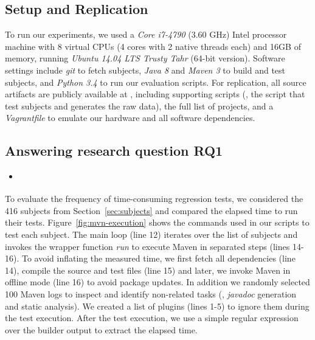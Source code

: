 \subsection{Setup and Replication}
\label{sec:setup}

To run our experiments, we used a \emph{Core i7-4790} (3.60 GHz) Intel
processor machine with 8 virtual CPUs (4 cores with 2 native threads
each) and 16GB of memory, running \emph{Ubuntu 14.04 LTS Trusty Tahr}
(64-bit version). Software settings include \emph{git} to fetch
subjects, \emph{Java 8} and \emph{Maven 3} to build and test subjects,
and \emph{Python 3.4} to run our evaluation scripts. For replication,
all source artifacts are publicly available at ,
including supporting scripts (\eg, the script that test subjects and
generates the raw data), the full list of projects, and a
\emph{Vagrantfile} to emulate our hardware and all software
dependencies.

\subsection{Answering research question RQ1}
\label{sec:rqone}

\begin{itemize}
    \item \emph{\RQA}
\end{itemize}

To evaluate the frequency of time-consuming regression tests, we
considered the 416 subjects from Section~\ref{sec:subjects} and
compared the elapsed time to run their tests.
Figure~\ref{fig:mvn-execution} shows the commands used in our scripts
to test each subject. The main loop (line 12) iterates over the list
of subjects and invokes the wrapper function \emph{run} to execute
Maven in separated steps (lines 14-16). To avoid inflating the
measured time, we first fetch all dependencies (line 14), compile the
source and test files (line 15) and later, we invoke Maven in offline
mode (line 16) to avoid package updates. In addition we randomly
selected 100 Maven logs to inspect and identify non-related tasks
(\eg, \emph{javadoc} generation and static analysis). We created a
list of plugins (lines 1-5) to ignore them during the test execution.
After the test execution, we use a simple regular expression over
the builder output to extract the elapsed time.

